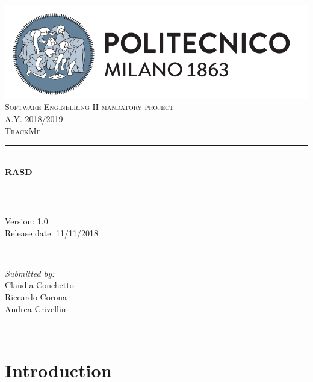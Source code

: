 \documentclass[11pt]{article}
\begin{document}
\begin{titlepage}
	\centering
	\vspace*{0.5 cm}
	\includegraphics[scale = 0.5]{PolimiLogo.png}\\[1.0 cm]
	\textsc{\Large Software Engineering II mandatory project}\\[0.2 cm]
	\textsc{\Large A.Y. 2018/2019}\\[2.0 cm]
	\textsc{\LARGE TrackMe}\\[0.5 cm]
	\rule{\linewidth}{0.2 mm}\\[0.4 cm]
	{\huge \bfseries RASD}\\[0.4cm]

	\rule{\linewidth}{0.2 mm} \\[1.5 cm]

	\begin{minipage}{0.4\textwidth}
		\begin{flushleft} \large
			Version: 1.0\\
			Release date: 11/11/2018\\
		\end{flushleft}
	\end{minipage}~
	\begin{minipage}{0.4\textwidth}
		\begin{flushright} \large
			\emph{Submitted by:} \\
			Claudia Conchetto\\
			Riccardo Corona\\
			Andrea Crivellin\\
		\end{flushright}
	\end{minipage}\\[2 cm]
\end{titlepage}

\tableofcontents
\newpage

\section{Introduction}

%
\end{document}
